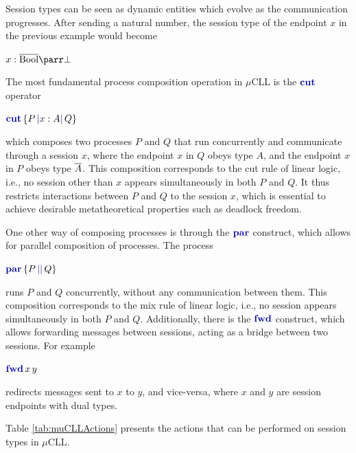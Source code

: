 Session types can be seen as dynamic entities which evolve as the communication progresses. After sending a natural number, the session type of the endpoint $x$ in the previous example would become\\
\centerline{\vspace{2pt}$
    x : \dual{\text{Bool}} \parr \bot
$}
The most fundamental process composition operation in $\mu$CLL is the $\cutp$ operator\\
\centerline{\vspace{2pt}$\cutc{P}{x: A}{Q}$}
which composes two processes $P$ and $Q$ that run concurrently and communicate through a session $x$, where the endpoint $x$ in $Q$ obeys type $A$, and the endpoint $x$ in $P$ obeys type $\overline{A}$. This composition corresponds to the cut rule of linear logic, i.e., no session other than $x$ appears simultaneously in both $P$ and $Q$. It thus restricts interactions between $P$ and $Q$ to the session $x$, which is essential to achieve desirable metatheoretical properties such as deadlock freedom.

One other way of composing processes is through the $\parp$ construct, which allows for parallel composition of processes. The process\\
\centerline{$\parc{P}{Q}$}
runs $P$ and $Q$ concurrently, without any communication between them. This composition corresponds to the mix rule of linear logic, i.e., no session appears simultaneously in both $P$ and $Q$. Additionally, there is the $\fwdp$ construct, which allows forwarding messages between sessions, acting as a bridge between two sessions. For example\\
\centerline{$\fwdc{x}{y}$}
redirects messages sent to $x$ to $y$, and vice-versa, where $x$ and $y$ are session endpoints with dual types.

Table \ref{tab:muCLLActions} presents the actions that can be performed on session types in $\mu$CLL.

